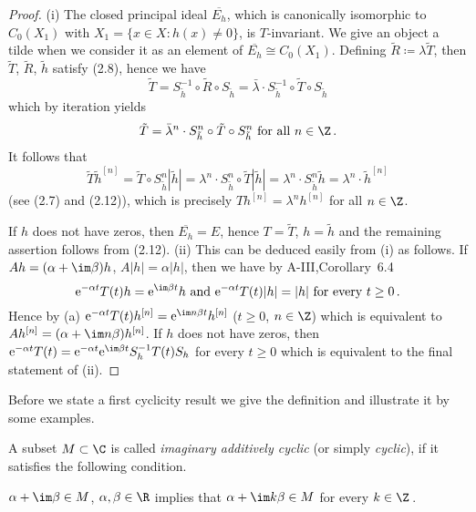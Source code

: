 \begin{proof}
	(i) The closed principal ideal $\overline{E_{h}}$, which is canonically isomorphic to $C_{0}(X_{1})$ with $X_{1} = \{x \in X \colon h(x) \neq 0\}$, is $T$-invariant.
	We give an object a tilde when we consider it as an element of $\overline{E_{h}} \cong C_{0}(X_{1})$.
	Defining $\tilde{R} \coloneqq \lambda\tilde{T}$, then $\tilde{T}$, $\tilde{R}$, $\tilde{h}$ satisfy (2.8), hence we have
	\begin{equation}\label{eq:b3-2.12}
		\tilde{T} = S_{\tilde{h}}^{-1} \circ \tilde{R} \circ S_{\tilde{h}} = \bar{\lambda} \cdot S_{\tilde{h}}^{-1} \circ \tilde{T} \circ S_{\tilde{h}}
	\end{equation}
	which by iteration yields
	\begin{equation}\label{eq:b3-2.13}
		\tilde{T} = \bar{\lambda}^{n} \cdot S_{\tilde{h}}^{n} \circ \tilde{T} \circ S_{\tilde{h}}^{n} \text{ for all } n \in \Z\,.
	\end{equation}
	It follows that
		\begin{equation*}
		\tilde{T}\tilde{h}^{[n]} = \tilde{T} \circ S_{\tilde{h}}^{n}|\tilde{h}| = \lambda^{n} \cdot S_{\tilde{h}}^{n} \circ \tilde{T}|\tilde{h}| 
		= \lambda^{n} \cdot S_{\tilde{h}}^{n}\tilde{h} = \lambda^{n} \cdot \tilde{h}^{[n]}
	\end{equation*}
	(see (2.7) and (2.12)), which is precisely $Th^{[n]} = \lambda^{n}h^{[n]}$ for all $n \in \Z$.
	
	If $h$ does not have zeros, then $\overline{E_{h}} = E$, hence $T = \tilde{T}$, $h = \tilde{h}$ and the remaining assertion follows from (2.12).
%		
	(ii) This can be deduced easily from (i) as follows. 
	If $Ah = (\alpha+\im\beta )h$, $A|h| = \alpha|h|$, then we have by A-III,Corollary~6.4
	\[
	\mathrm{e}^{-\alpha t}T(t)h = \mathrm{e}^{\im\beta  t}h \text{ and } \mathrm{e}^{-\alpha t}T(t)|h| = |h| \text{ for every } t \geq 0\,.
	\]
	Hence by (a) $\mathrm{e}^{-\alpha t}T(t)h^{[n]} = \mathrm{e}^{\im n\beta t}h^{[n]}$ ($t \geq 0$, $n \in \Z$) which is equivalent to $Ah^{[n]} = (\alpha+\im n\beta)h^{[n]}$.
	If $h$ does not have zeros, then $\mathrm{e}^{-\alpha t}T(t) = \mathrm{e}^{-\alpha t}\mathrm{e}^{\im\beta  t}S_{h}^{-1}T(t)S_{h}$ for every $t \geq 0$ which is equivalent to the final statement of (ii).
	\end{proof}
Before we state a first cyclicity result we give the definition and illustrate it by some examples.
\begin{definition}\label{def:b3-2.5}
		
A subset $M \subset \C$ is called \emph{imaginary additively cyclic} (or simply \emph{cyclic}), if it satisfies the following condition. 

$\alpha + \im\beta \in M$, $\alpha,\beta \in \R$ implies that $\alpha +  \im k\beta \in M$ for every $k \in \Z$\,.
	\end{definition}
	
